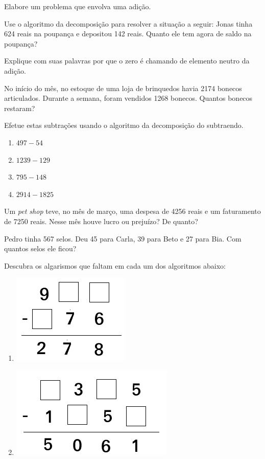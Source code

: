 		\item Elabore um problema que envolva uma adição.
		
		\item Use o algoritmo da decomposição para resolver a situação a seguir: Jonas tinha 624 reais na poupança e depositou 142 reais. Quanto ele tem agora de saldo na poupança?
		\item Explique com suas palavras por que o zero é chamando de elemento neutro da adição.
		
		\item No início do mês, no estoque de uma loja de brinquedos havia 2174 bonecos articulados. Durante a semana, foram vendidos 1268 bonecos. Quantos bonecos restaram?
		
		\item Efetue estas subtrações usando o algoritmo da  decomposição do subtraendo.		
		\begin{multicols}{4}
		\begin{enumerate}
			\item $497-54$
			\item $1239-129$
			\item $795-148$
			\item $2914-1825$
		\end{enumerate}
		\end{multicols}
		
		\item Um \textit{pet shop} teve, no mês de março, uma despesa de 4256 reais e um faturamento de 7250 reais. Nesse mês houve lucro ou prejuízo? De quanto?
		\item Pedro tinha 567 selos. Deu 45 para Carla, 39 para Beto e 27 para Bia. Com quantos selos ele ficou?
		\item Descubra os algarismos que faltam em cada um dos algoritmos abaixo:
		\begin{multicols}{2}
		\begin{enumerate}
			\item \includegraphics[scale=0.4]{figuras/fig66.png}
			\item \includegraphics[scale=0.4]{figuras/fig67.png}
		\end{enumerate}
		\end{multicols}
		
